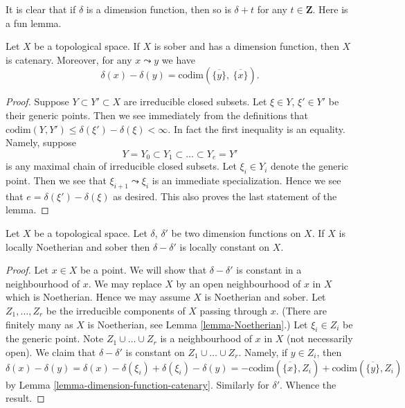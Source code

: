 \noindent
It is clear that if $\delta$ is a dimension function, then so is
$\delta + t$ for any $t \in \mathbf{Z}$. Here is a fun lemma.

\begin{lemma}
\label{lemma-dimension-function-catenary}
Let $X$ be a topological space. If $X$ is sober and has a dimension
function, then $X$ is catenary. Moreover, for any $x \leadsto y$
we have
$$
\delta(x) - \delta(y) =
\text{codim}\left(\overline{\{y\}}, \ \overline{\{x\}}\right).
$$
\end{lemma}

\begin{proof}
Suppose $Y \subset Y' \subset X$ are irreducible closed subsets.
Let $\xi \in Y$, $\xi' \in Y'$ be their generic points.
Then we see immediately from the definitions that
$\text{codim}(Y, Y') \leq \delta(\xi') - \delta(\xi) < \infty$.
In fact the first inequality is an equality. Namely, suppose
$$
Y = Y_0 \subset Y_1 \subset \ldots \subset Y_e = Y'
$$
is any maximal chain of irreducible closed subsets. Let
$\xi_i \in Y_i$ denote the generic point. Then we see that
$\xi_{i + 1} \leadsto \xi_i$ is an immediate specialization.
Hence we see that $e = \delta(\xi') - \delta(\xi)$ as desired.
This also proves the last statement of the lemma.
\end{proof}

\begin{lemma}
\label{lemma-dimension-function-unique}
Let $X$ be a topological space.
Let $\delta$, $\delta'$ be two dimension functions on $X$.
If $X$ is locally Noetherian and sober then $\delta - \delta'$ is
locally constant on $X$.
\end{lemma}

\begin{proof}
Let $x \in X$ be a point. We will show that $\delta - \delta'$ is
constant in a neighbourhood of $x$.
We may replace $X$ by an open neighbourhood
of $x$ in $X$ which is Noetherian. Hence we may assume $X$ is
Noetherian and sober.
Let $Z_1, \ldots, Z_r$ be the irreducible
components of $X$ passing through $x$. (There are finitely many as
$X$ is Noetherian, see Lemma \ref{lemma-Noetherian}.)
Let $\xi_i \in Z_i$ be the generic point.
Note $Z_1 \cup \ldots \cup Z_r$ is a neighbourhood of $x$ in $X$
(not necessarily open). We claim that $\delta - \delta'$ is
constant on $Z_1 \cup \ldots \cup Z_r$. Namely, if $y \in Z_i$,
then
$$
\delta(x) - \delta(y) = \delta(x) - \delta(\xi_i) + \delta(\xi_i) - \delta(y)
= - \text{codim}(\overline{\{x\}}, Z_i)
+ \text{codim}(\overline{\{y\}}, Z_i)
$$
by Lemma \ref{lemma-dimension-function-catenary}.
Similarly for $\delta'$. Whence the result.
\end{proof}

